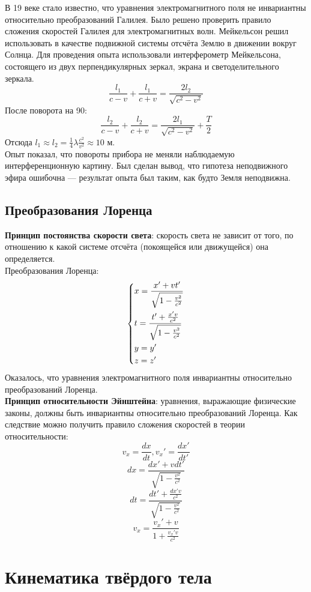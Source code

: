 \documentclass[fleqn,a4paper,12pt,titlepage,finall]{article}
\begin{document}
В 19 веке стало известно, что уравнения электромагнитного поля не инвариантны
относительно преобразований Галилея. Было решено проверить правило сложения
скоростей Галилея для электромагнитных волн. Мейкельсон решил использовать в
качестве подвижной системы отсчёта Землю в движении вокруг Солнца. Для
проведения опыта использовали интерферометр Мейкельсона, состоящего из двух
перпендикулярных зеркал, экрана и светоделительного зеркала.
\[\frac{l_1}{c-v} + \frac{l_1}{c+v} = \frac{2l_2}{\sqrt{c^2-v^2}}\]
После поворота на 90\textdegree:
\[\frac{l_2}{c-v} + \frac{l_2}{c+v} = \frac{2l_1}{\sqrt{c^2-v^2}} + \frac{T}{2}\]
Отсюда $l_1 \approx l_2 = \frac{1}{4}\lambda \frac{c^2}{v^2} \approx 10$ м.\\
Опыт показал, что повороты прибора не меняли наблюдаемую интерференционную
картину. Был сделан вывод, что гипотеза неподвижного эфира ошибочна ---
результат опыта был таким, как будто Земля неподвижна.
\subsection{Преобразования Лоренца}
{\bf Принцип постоянства скорости света}: скорость света не зависит от того,
по отношению к какой системе отсчёта (покоящейся или движущейся) она
определяется. \\
Преобразования Лоренца:
\[\begin{dcases}
	x = \frac{x' + vt'}{\sqrt{1 - \frac{v^2}{c^2}}} \\
	t = \frac{t' + \frac{x'v}{c^2}}{\sqrt{1 - \frac{v^2}{c^2}}} \\
	y = y' \\
	z = z' \\
\end{dcases}\]
Оказалось, что уравнения электромагнитного поля инвариантны относительно
преобразований Лоренца.\\
{\bf Принцип относительности Эйнштейна}: уравнения, выражающие физические
законы, должны быть инвариантны относительно преобразований Лоренца.
Как следствие можно получить правило сложения скоростей в теории
относительности:
\[v_x = \frac{dx}{dt}, v_x' = \frac{dx'}{dt'}\]
\[dx = \frac{dx' + vdt'}{\sqrt{1 - \frac{v^2}{c^2}}}\]
\[dt = \frac{dt' + \frac{dx'v}{c^2}}{\sqrt{1 - \frac{v^2}{c^2}}}\]
\[\boxed{v_x = \frac{v_x' + v}{1+\frac{v_x'v}{c^2}}}\]

\section{Кинематика твёрдого тела}
\end{document}
